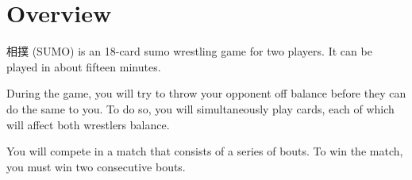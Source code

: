 \section*{Overview}
相撲 (SUMO) is an 18-card sumo wrestling game for two players. It can be played in about fifteen minutes.

During the game, you will try to throw your opponent off balance before they can do the same to you.
To do so, you will simultaneously play cards, each of which will affect both wrestlers balance.

You will compete in a match that consists of a series of bouts.
To win the match, you must win two consecutive bouts.

%
%
%
%
